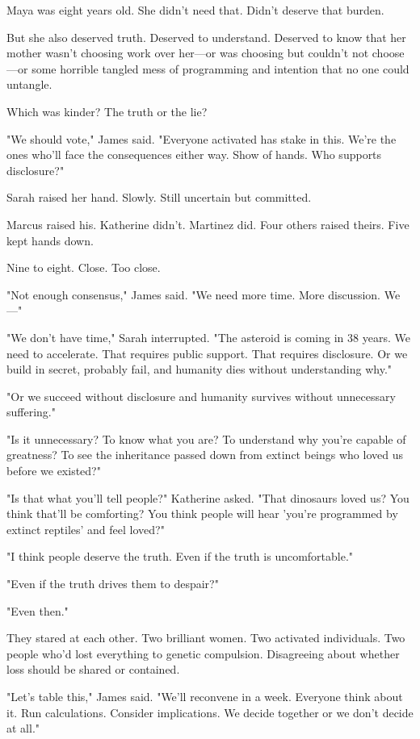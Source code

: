 Maya was eight years old. She didn't need that. Didn't deserve that burden.

But she also deserved truth. Deserved to understand. Deserved to know that her mother wasn't choosing work over her—or was choosing but couldn't not choose—or some horrible tangled mess of programming and intention that no one could untangle.

Which was kinder? The truth or the lie?

"We should vote," James said. "Everyone activated has stake in this. We're the ones who'll face the consequences either way. Show of hands. Who supports disclosure?"

Sarah raised her hand. Slowly. Still uncertain but committed.

Marcus raised his. Katherine didn't. Martinez did. Four others raised theirs. Five kept hands down.

Nine to eight. Close. Too close.

"Not enough consensus," James said. "We need more time. More discussion. We—"

"We don't have time," Sarah interrupted. "The asteroid is coming in 38 years. We need to accelerate. That requires public support. That requires disclosure. Or we build in secret, probably fail, and humanity dies without understanding why."

"Or we succeed without disclosure and humanity survives without unnecessary suffering."

"Is it unnecessary? To know what you are? To understand why you're capable of greatness? To see the inheritance passed down from extinct beings who loved us before we existed?"

"Is that what you'll tell people?" Katherine asked. "That dinosaurs loved us? You think that'll be comforting? You think people will hear 'you're programmed by extinct reptiles' and feel loved?"

"I think people deserve the truth. Even if the truth is uncomfortable."

"Even if the truth drives them to despair?"

"Even then."

They stared at each other. Two brilliant women. Two activated individuals. Two people who'd lost everything to genetic compulsion. Disagreeing about whether loss should be shared or contained.

"Let's table this," James said. "We'll reconvene in a week. Everyone think about it. Run calculations. Consider implications. We decide together or we don't decide at all."


